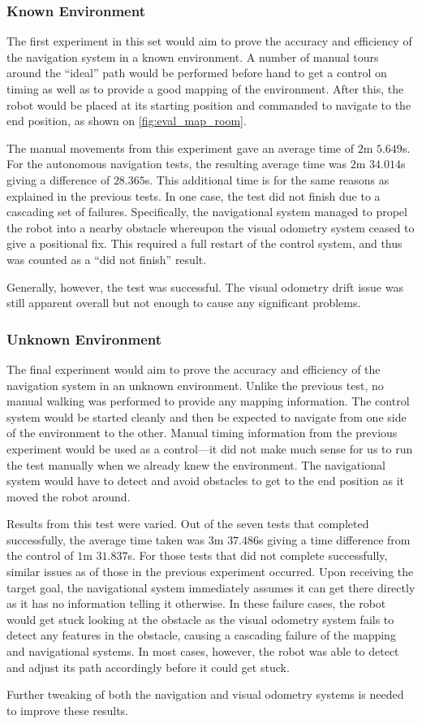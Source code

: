 \subsubsection{Known Environment}

The first experiment in this set would aim to prove the accuracy and efficiency of the navigation system in a known environment. A number of manual tours around the ``ideal'' path would be performed before hand to get a control on timing as well as to provide a good mapping of the environment. After this, the robot would be placed at its starting position and commanded to navigate to the end position, as shown on \autoref{fig:eval_map_room}.

The manual movements from this experiment gave an average time of $2$m $5.649$s. For the autonomous navigation tests, the resulting average time was $2$m $34.014$s giving a difference of $28.365$s. This additional time is for the same reasons as explained in the previous tests. In one case, the test did not finish due to a cascading set of failures. Specifically, the navigational system managed to propel the robot into a nearby obstacle whereupon the visual odometry system ceased to give a positional fix. This required a full restart of the control system, and thus was counted as a ``did not finish'' result.

Generally, however, the test was successful. The visual odometry drift issue was still apparent overall but not enough to cause any significant problems.

\subsubsection{Unknown Environment}

The final experiment would aim to prove the accuracy and efficiency of the navigation system in an unknown environment. Unlike the previous test, no manual walking was performed to provide any mapping information. The control system would be started cleanly and then be expected to navigate from one side of the environment to the other. Manual timing information from the previous experiment would be used as a control---it did not make much sense for us to run the test manually when we already knew the environment. The navigational system would have to detect and avoid obstacles to get to the end position as it moved the robot around. 

Results from this test were varied. Out of the seven tests that completed successfully, the average time taken was $3$m $37.486$s giving a time difference from the control of $1$m $31.837$s. For those tests that did not complete successfully, similar issues as of those in the previous experiment occurred. Upon receiving the target goal, the navigational system immediately assumes it can get there directly as it has no information telling it otherwise. In these failure cases, the robot would get stuck looking at the obstacle as the visual odometry system fails to detect any features in the obstacle, causing a cascading failure of the mapping and navigational systems. In most cases, however, the robot was able to detect and adjust its path accordingly before it could get stuck.

Further tweaking of both the navigation and visual odometry systems is needed to improve these results.